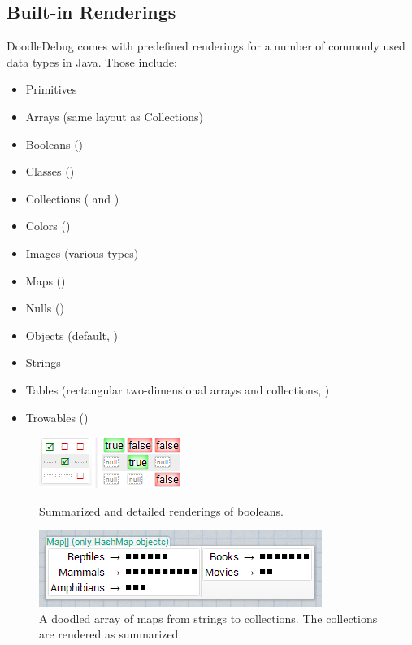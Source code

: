 \documentclass[english]{scrartcl}
\newcommand{\DD}{Dood\-le\-De\-bug\xspace}
\begin{document}
\subsection{Built-in Renderings}
\DD comes with predefined renderings for a number of commonly used data types in Java.
Those include:
\begin{itemize}[noitemsep]
\item Primitives
\item Arrays (same layout as Collections)
\item Booleans ()
\item Classes ()
\item Collections ( and )
\item Colors ()
\item Images (various types)
\item Maps ()
\item Nulls ()
\item Objects (default, )
\item Strings
\item Tables (rectangular two-dimensional arrays and collections, )
\item Trowables ()
\end{itemize}

\begin{figure}[h]
\begin{minipage}[t]{0.4\linewidth}
	\centering
	\includegraphics{img/Plugin_Boolean.png}
	\caption{Summarized and detailed renderings of booleans.}
\end{minipage}
\hspace{0.03\linewidth}
\begin{minipage}[t]{0.57\linewidth}
	\centering
	\includegraphics[width=\linewidth]{img/Plugin_Collections-small.png}
	\caption{A doodled array of maps from strings to collections. The collections are rendered as summarized.}
\end{minipage}
\end{figure}
\end{document}
